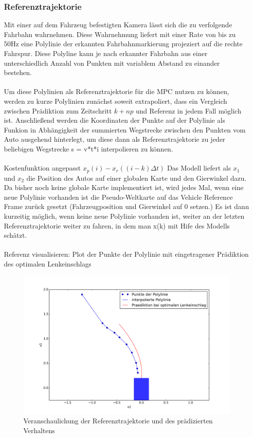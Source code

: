 \subsubsection{Referenztrajektorie}
Mit einer auf dem Fahrzeug befestigten Kamera lässt sich die zu verfolgende Fahrbahn wahrnehmen. Diese Wahrnehmung liefert mit einer Rate von bis zu 50Hz eine Polylinie der erkannten Fahrbahnmarkierung projeziert auf die rechte Fahrspur. Diese Polyline kann je nach erkannter Fahrbahn aus einer unterschiedlich Anzahl von Punkten mit variablem Abstand zu einander bestehen.\\ \\
Um diese Polylinien als Referenztrajektorie für die MPC nutzen zu können, werden zu kurze Polylinien zunächst soweit extrapoliert, dass ein Vergleich zwischen Prädiktion zum Zeitschritt $k+np$ und Referenz in jedem Fall möglich ist. Anschließend werden die Koordinaten der Punkte auf der Polylinie als Funkion in Abhängigkeit der summierten Wegstrecke zwischen den Punkten vom Auto ausgehend hinterlegt, um diese dann als Referenztrajektorie zu jeder beliebigen Wegstrecke s = v*t*i interpolieren zu können.\\ \\
Kostenfunktion angepasst $x_p(i)-x_r((i-k)\Delta t)$
Das Modell liefert als $x_1$ und $x_2$ die Position des Autos auf einer globalen Karte und den Gierwinkel dazu. Da bisher noch keine globale Karte implementiert ist, wird jedes Mal, wenn eine neue Polylinie vorhanden ist die Pseudo-Weltkarte auf das Vehicle Reference Frame zurück gesetzt (Fahrzeugposition und Gierwinkel auf 0 setzen.) Es ist dann kurzeitig möglich, wenn keine neue Polylinie vorhanden ist, weiter an der letzten Referenztrajektorie weiter zu fahren, in dem man x(k) mit Hife des Modells schätzt.\\ \\
Referenz visualisieren: Plot der Punkte der Polylinie mit eingetragener Prädiktion des optimalen Lenkeinschlags\\
\begin{figure}[t]
\centering
\includegraphics[scale=0.53]{Bilder/Reference.png}
\caption{Veranschaulichung der Referenztrajektorie und des prädizierten Verhaltens}
\end{figure}
